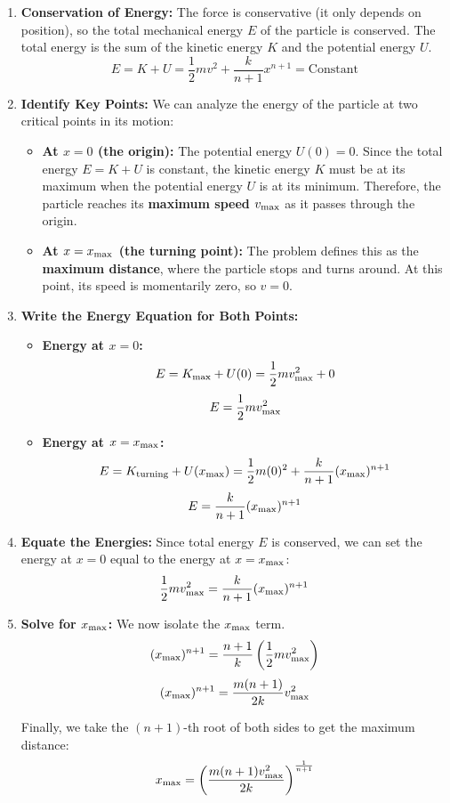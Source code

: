 \documentclass[11pt, a4paper]{article} %
\begin{document}
\begin{enumerate}
    \item \textbf{Conservation of Energy:} The force is conservative (it only depends on position), so the total mechanical energy $E$ of the particle is conserved. The total energy is the sum of the kinetic energy $K$ and the potential energy $U$.
    $$E = K + U = \frac{1}{2}mv^2 + \frac{k}{n+1}x^{n+1} = \text{Constant}$$

    \item \textbf{Identify Key Points:} We can analyze the energy of the particle at two critical points in its motion:
    \begin{itemize}
        \item \textbf{At $x=0$ (the origin):} The potential energy $U(0) = 0$. Since the total energy $E = K + U$ is constant, the kinetic energy $K$ must be at its maximum when the potential energy $U$ is at its minimum. Therefore, the particle reaches its \textbf{maximum speed $v_{\rm max}$} as it passes through the origin.
        \item \textbf{At $x=x_{\rm max}$ (the turning point):} The problem defines this as the \textbf{maximum distance}, where the particle stops and turns around. At this point, its speed is momentarily zero, so $v=0$.
    \end{itemize}

    \item \textbf{Write the Energy Equation for Both Points:}
    \begin{itemize}
        \item \textbf{Energy at $x=0$:}
        $$E = K_{\text{max}} + U(0) = \frac{1}{2}m v_{\rm max}^2 + 0$$
        $$E = \frac{1}{2}m v_{\rm max}^2$$

        \item \textbf{Energy at $x=x_{\rm max}$:}
        $$E = K_{\text{turning}} + U(x_{\rm max}) = \frac{1}{2}m(0)^2 + \frac{k}{n+1} (x_{\rm max})^{n+1}$$
        $$E = \frac{k}{n+1} (x_{\rm max})^{n+1}$$
    \end{itemize}

    \item \textbf{Equate the Energies:} Since total energy $E$ is conserved, we can set the energy at $x=0$ equal to the energy at $x=x_{\rm max}$:
    $$\frac{1}{2}m v_{\rm max}^2 = \frac{k}{n+1} (x_{\rm max})^{n+1}$$

    \item \textbf{Solve for $x_{\rm max}$:} We now isolate the $x_{\rm max}$ term.
    $$(x_{\rm max})^{n+1} = \frac{n+1}{k} \left( \frac{1}{2}m v_{\rm max}^2 \right)$$
    $$(x_{\rm max})^{n+1} = \frac{m(n+1)}{2k} v_{\rm max}^2$$

    Finally, we take the $(n+1)$-th root of both sides to get the maximum distance:
    $$x_{\rm max} = \left( \frac{m(n+1)v_{\rm max}^2}{2k} \right)^{\frac{1}{n+1}}$$
\end{enumerate}
\end{document}
